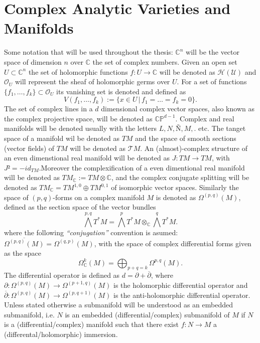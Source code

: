 \documentclass[12pt,twoside,a4paper]{report}
\newcommand{\co}{\ensuremath{\mathbb C }}
\newcommand{\con}{\ensuremath{\mathbb{C}^n}}
\newcommand{\cp}{\ensuremath{\mathbb{CP}}}
\begin{document}
\chapter{Complex Analytic Varieties and Manifolds}
\pagestyle{fancy}
\fancyhf{}
\fancyhead[LE]{\rightmark}
\fancyhead[RO]{\leftmark}
\fancyfoot[C]{\thepage}
Some notation that will be used throughout the thesis: $\con$ will be the vector space of dimension $n$ over $\co$ the set of complex numbers. Given an open set $U\subset\con$ the set of holomorphic functions $f:U\rightarrow\co$ will be denoted as $\mathcal{H(U)}$ and $\mathcal{O}_{U}$ will represent the sheaf of holomorphic germs over $U$.
For a set of functions $\{f_{1},\dots,f_{k}\}\subset\mathcal{O}_{U}$ its vanishing set is denoted and defined as
\[
  V(f_{1},\dots,f_{k}):=\{x\in U\,\vert\,f_{1}=\dots =f_{k}=0\}.
\]
The set of complex lines in a $d$ dimensional complex vector spaces, also known as the complex projective space, will be denoted as $\cp^{d-1}$. Complex and real manifolds will be denoted usually with the letters $L, N, Ñ, M,$. etc. The tanget space of a manifold wil be denoted as $TM$ and the space of smooth sections (vector fields) of $TM$ will be denoted as $\mathcal{T}M$.
An (almost)-complex structure of an even dimenstional real manifold will be denoted as $J:TM\rightarrow TM$, with $J²=-id_{TM}$.Moreover the complexification of a even dimentional real manifold will be denoted as $TM_{\co}:=TM\otimes\co$, and the complex conjugate splitting will be denoted as $TM_{\co}=TM^{1,0}\oplus TM^{0,1}$ of isomorphic vector spaces.
Similarly the space of $(p,q)$-forms on a complex manifold $M$ is denoted as $\Omega^{(p,q)}(M)$, defined as the section space of the vector bundles
\[
  \bigwedge^{p,q}T^{*}M=\bigwedge^{p}T^{*}M\otimes_{\co}\bigwedge^{q}T^{*}M.
\]
\noindent where the following \emph{``conjugation''} convention is asumed: $\overline{\Omega^{(p,q)}(M)}=\Omega^{(q,p)}(M)$, with the space of complex differential forms given as the space
\[
  \Omega^{k}_{\co}(M)=\bigoplus_{p+q=k}\Omega^{p,q}(M).
\]
\noindent The differential operator is defined as $d=\partial + \overline{\partial}$, where $\partial:\Omega^{(p,q)}(M)\rightarrow \Omega^{(p+1,q)}(M)$ is the holomorphic differential operator and $\overline{\partial}:\Omega^{(p,q)}(M)\rightarrow\Omega^{(p,q+1)}(M)$ is the anti-holomorphic differential operator.\\
Unless stated otherwise a submanifold will be understood as an embedded submanifold, i.e. $N$ is an embedded (differential/complex) submanifold of $M$ if $N$ is a (differential/complex) manifold such that there exist $f:N\rightarrow M$ a (differental/holomorphic) immersion.
\end{document}
